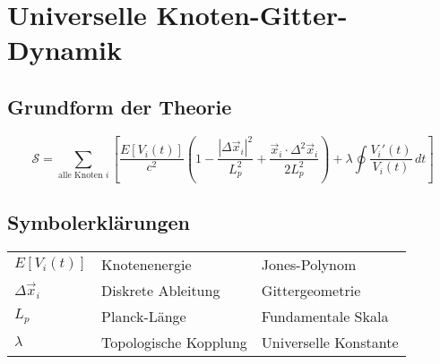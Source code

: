 \section{Universelle Knoten-Gitter-Dynamik}

\subsection{Grundform der Theorie}
\begin{equation}
\mathcal{S} = \sum_{\text{alle Knoten } i} \left[ 
\frac{E[V_i(t)]}{c^2} \left( 
1 - \frac{|\Delta \vec{x}_i|^2}{L_p^2} + \frac{\vec{x}_i \cdot \Delta^2 \vec{x}_i}{2 L_p^2} 
\right) 
+ \lambda \oint \frac{V_i'(t)}{V_i(t)} \, dt 
\right]
\end{equation}

\subsection{Symbolerklärungen}
\begin{tabular}{lll}
    \( E[V_i(t)] \) & Knotenenergie & Jones-Polynom \\
    \( \Delta \vec{x}_i \) & Diskrete Ableitung & Gittergeometrie \\
    \( L_p \) & Planck-Länge & Fundamentale Skala \\
    \( \lambda \) & Topologische Kopplung & Universelle Konstante \\
\end{tabular}